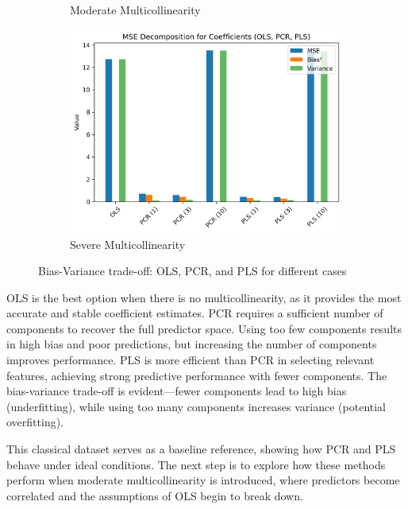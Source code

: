 \documentclass[11pt,twoside,a4paper]{article}
\begin{document}
\begin{figure}[H]
\begin{subfigure}{0.32\textwidth}
        \caption{Moderate Multicollinearity}
        \label{fig:Moderate_multicollinear_data_analysis}
    \end{subfigure}
    \hfill
    \begin{subfigure}{0.32\textwidth}
        \centering
        \includegraphics[width=\linewidth]{Fifth_plot_third_simulation.png}
        \caption{Severe Multicollinearity}
        \label{fig:Severe_multicollinear_data_analysis}
    \end{subfigure}
    \caption{Bias-Variance trade-off: OLS, PCR, and PLS for different cases}
    \label{fig:BiasVarianceTradeoff}
\end{figure}

OLS is the best option when there is no multicollinearity, as it provides the most accurate and stable coefficient estimates. PCR requires a sufficient number of components to recover the full predictor space. Using too few components results in high bias and poor predictions, but increasing the number of components improves performance. PLS is more efficient than PCR in selecting relevant features, achieving strong predictive performance with fewer components. The bias-variance trade-off is evident—fewer components lead to high bias (underfitting), while using too many components increases variance (potential overfitting).

This classical dataset serves as a baseline reference, showing how PCR and PLS behave under ideal conditions. The next step is to explore how these methods perform when moderate multicollinearity is introduced, where predictors become correlated and the assumptions of OLS begin to break down.
\end{document}
